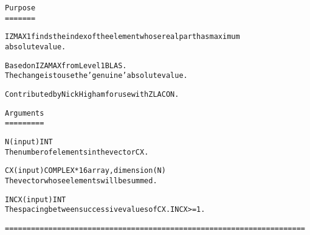 \small\begin{alltt}
    Purpose   
    =======\end{alltt}\normalsize 


\small\begin{alltt}    IZMAX1 finds the index of the element whose real part has maximum   
    absolute value.\end{alltt}\normalsize 


\small\begin{alltt}    Based on IZAMAX from Level 1 BLAS.   
    The change is to use the 'genuine' absolute value.\end{alltt}\normalsize 


\small\begin{alltt}    Contributed by Nick Higham for use with ZLACON.\end{alltt}\normalsize 


\small\begin{alltt}    Arguments   
    =========\end{alltt}\normalsize 


\small\begin{alltt}    N       (input) INT   
            The number of elements in the vector CX.\end{alltt}\normalsize 


\small\begin{alltt}    CX      (input) COMPLEX*16 array, dimension (N)   
            The vector whose elements will be summed.\end{alltt}\normalsize 


\small\begin{alltt}    INCX    (input) INT   
            The spacing between successive values of CX.  INCX >= 1.\end{alltt}\normalsize 


\small\begin{alltt}   ===================================================================== 
\end{alltt}\normalsize 
 